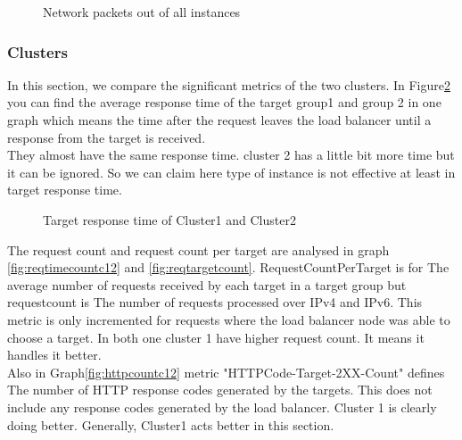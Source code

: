\documentclass[12pt]{article}
\begin{document}
    \begin{figure}[htpb]
        \centering
            \caption{Network packets out of all instances}
            \label{fig:netout}
        \end{figure}


        
        \subsubsection{Clusters}
            In this section, we compare the significant metrics of the two clusters. In Figure\ref{fig:targerresponsetimec12} you can find the average response time of the target group1 and group 2 in one graph which means the time after the request leaves the load balancer until a response from the target is received.\\
            They almost have the same response time. cluster 2 has a little bit more time but it can be ignored. So we can claim here type of instance is not effective at least in target response time.\\
          
                \begin{figure}[htpb]
                \centering
                    \caption{Target response time of Cluster1 and Cluster2}
                    \label{fig:targerresponsetimec12}
                \end{figure}


                The request count and request count per target are analysed in graph \ref{fig:reqtimecountc12} and \ref{fig:reqtargetcount}. RequestCountPerTarget is for The average number of requests received by each target in a target group but requestcount is The number of requests processed over IPv4 and IPv6. This metric is only incremented for requests where the load balancer node was able to choose a target. In both one cluster 1 have higher request count. It means it handles it better.\\
                Also in Graph\ref{fig:httpcountc12} metric "HTTPCode-Target-2XX-Count" defines The number of HTTP response codes generated by the targets. This does not include any response codes generated by the load balancer. Cluster 1 is clearly doing better. Generally, Cluster1 acts better in this section.
\end{document}
